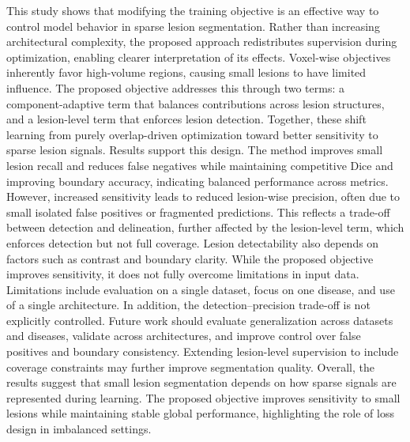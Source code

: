 This study shows that modifying the training objective is an effective way
to control model behavior in sparse lesion segmentation. Rather than
increasing architectural complexity, the proposed approach redistributes
supervision during optimization, enabling clearer interpretation of its
effects. Voxel-wise objectives inherently favor high-volume regions, causing small
lesions to have limited influence. The proposed objective addresses this
through two terms: a component-adaptive term that balances contributions
across lesion structures, and a lesion-level term that enforces lesion
detection. Together, these shift learning from purely overlap-driven
optimization toward better sensitivity to sparse lesion signals. Results support this design. The method improves small lesion recall and reduces false negatives while maintaining competitive Dice and improving
boundary accuracy, indicating balanced performance across metrics. However, increased sensitivity leads to reduced lesion-wise precision, often due to small isolated false positives or fragmented predictions.
This reflects a trade-off between detection and delineation, further
affected by the lesion-level term, which enforces detection but not full
coverage. Lesion detectability also depends on factors such as contrast and boundary
clarity. While the proposed objective improves sensitivity, it does not
fully overcome limitations in input data. Limitations include evaluation on a single dataset, focus on one disease,
and use of a single architecture. In addition, the detection–precision
trade-off is not explicitly controlled. Future work should evaluate generalization across datasets and diseases,
validate across architectures, and improve control over false positives
and boundary consistency. Extending lesion-level supervision to include
coverage constraints may further improve segmentation quality. Overall, the results suggest that small lesion segmentation depends on how sparse signals are represented during learning. The proposed objective
improves sensitivity to small lesions while maintaining stable global
performance, highlighting the role of loss design in imbalanced settings.
